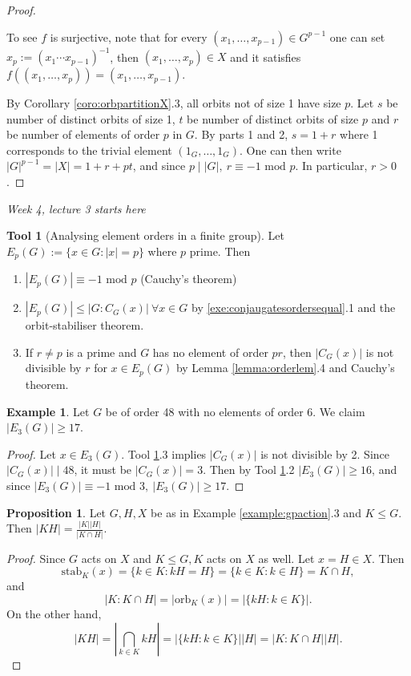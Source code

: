 \documentclass[a4paper]{article}
\newcommand{\orb}{\text{orb}}
\newcommand{\stab}{\text{stab}}
\newcommand{\Mod}{\text{ mod }}
\theoremstyle{definition}
\newtheorem{prop}[defn]{Proposition}
\newtheorem{example}[defn]{Example}
\newtheorem{tool}[defn]{Tool}
\begin{document}
\begin{proof}
\begin{enumerate}
\[\]
To see $f$ is surjective, note that for every $(x_1,\ldots,x_{p-1})\in G^{p-1}$ one can set $x_p:=(x_1\cdots x_{p-1})^{-1}$, then $(x_1,\ldots,x_p)\in X$ and it satisfies $f((x_1,\ldots,x_p))=(x_1,\ldots,x_{p-1})$.
\end{enumerate}
By Corollary \ref{coro:orbpartitionX}.3, all orbits not of size 1 have size $p$. Let $s$ be number of distinct orbits of size 1, $t$ be number of distinct orbits of size $p$ and $r$ be number of elements of order $p$ in $G$. By parts 1 and 2, $s=1+r$ where 1 corresponds to the trivial element $(1_G,\ldots,1_G)$. One can then write $|G|^{p-1}=|X|=1+r+pt$, and since $p\mid |G|,\ r\equiv -1\Mod p$. In particular, $r>0$.
\end{proof}

\begin{flushright}
\textit{Week 4, lecture 3 starts here}
\end{flushright}

\begin{tool}[Analysing element orders in a finite group]
\label{tool:elementorder}
Let $E_p(G):=\{x\in G:|x|=p\}$ where $p$ prime. Then
\begin{enumerate}
\item $|E_p(G)|\equiv -1\Mod p$ (Cauchy's theorem)
\item $|E_p(G)|\leq |G:C_G(x)| \ \forall x\in G$ by \ref{exe:conjaugatesordersequal}.1 and the orbit-stabiliser theorem.
\item If $r\neq p$ is a prime and $G$ has no element of order $pr$, then $|C_G(x)|$ is not divisible by $r$ for $x\in E_p(G)$ by Lemma \ref{lemma:orderlem}.4 and Cauchy's theorem.
\end{enumerate}
\end{tool}

\begin{example}
Let $G$ be of order 48 with no elements of order 6. We claim $|E_3(G)|\geq 17$.
\begin{proof}
Let $x\in E_3(G)$. Tool \ref{tool:elementorder}.3 implies $|C_G(x)|$ is not divisible by 2. Since $|C_G(x)|\mid 48$, it must be $|C_G(x)|=3$. Then by Tool \ref{tool:elementorder}.2 $|E_3(G)|\geq 16$, and since $|E_3(G)|\equiv -1\Mod 3,\ |E_3(G)|\geq 17$.
\end{proof}
\end{example}

\begin{prop}
\label{prop:orderofHK}
Let $G,H,X$ be as in Example \ref{example:gpaction}.3 and $K\leq G$. Then $|KH|=\frac{|K||H|}{|K\cap H|}$.
\end{prop}
\begin{proof}
Since $G$ acts on $X$ and $K\leq G, K$ acts on $X$ as well. Let $x=H\in X$. Then
\[
\stab_K(x)=\{k\in K:kH=H\}=\{k\in K:k\in H\}=K\cap H,
\]
and
\[
|K:K\cap H|=|\orb_K(x)|=|\{kH:k\in K\}|.
\]
On the other hand,
\[
|KH|=\left|\bigcap_{k\in K} kH\right| = |\{kH:k\in K\}||H|=|K:K\cap H||H|.
\]
\end{proof}
\end{document}
